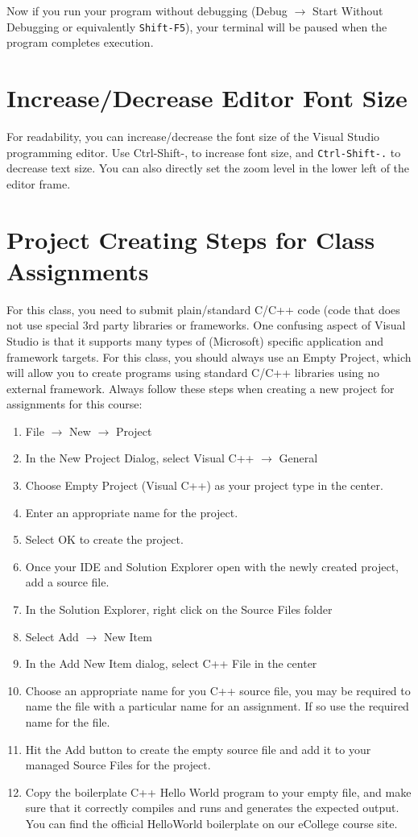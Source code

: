 \documentclass[11pt]{article}
\begin{document}
Now if you run your program without debugging (Debug $\rightarrow$ Start
Without Debugging or equivalently \verb~Shift-F5~), your terminal will be
paused when the program completes execution.
\section{Increase/Decrease Editor Font Size}
\label{sec-6}

For readability, you can increase/decrease the font size of the Visual
Studio programming editor. Use Ctrl-Shift-, to increase font size,
and \verb~Ctrl-Shift-.~ to decrease text size.  You can also directly set
the zoom level in the lower left of the editor frame.
\section{Project Creating Steps for Class Assignments}
\label{sec-7}

For this class, you need to submit plain/standard C/C++ code (code that does not use special 3rd party libraries
or frameworks.  One confusing aspect of Visual Studio is that it supports many types of (Microsoft) specific
application and framework targets.  For this class, you should always use an Empty Project, which will allow
you to create programs using standard C/C++ libraries using no external framework.  Always follow these
steps when creating a new project for assignments for this course:

\begin{enumerate}
\item File $\rightarrow$ New $\rightarrow$ Project
\item In the New Project Dialog, select Visual C++ $\rightarrow$ General
\item Choose Empty Project (Visual C++) as your project type in the center.
\item Enter an appropriate name for the project.
\item Select OK to create the project.
\item Once your IDE and Solution Explorer open with the newly created project, add a source file.
\item In the Solution Explorer, right click on the Source Files folder
\item Select Add $\rightarrow$ New Item
\item In the Add New Item dialog, select C++ File in the center
\item Choose an appropriate name for you C++ source file, you may be required to name the file with a particular name for an assignment.  If so use the required name for the file.
\item Hit the Add button to create the empty source file and add it to your managed Source Files for the project.
\item Copy the boilerplate C++ Hello World program to your empty file, and make sure that it correctly compiles and runs and generates the expected output.  You can find the official HelloWorld boilerplate on our eCollege course site.
\end{enumerate}
\end{document}
